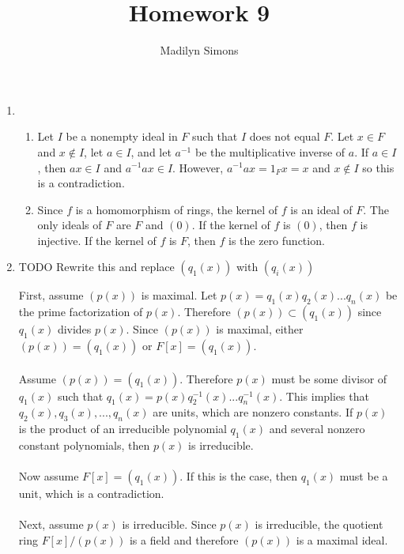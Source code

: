 \documentclass{article}
\title{Homework 9}
\author{Madilyn Simons}
\date{}
\begin{document}
\maketitle

\begin{enumerate}

\item
\begin{enumerate}

\item Let $I$ be a nonempty ideal in $F$ such that $I$ does not equal $F$.
Let $x \in F$ and $x \notin I$, let $a \in I$, and let $a^{-1}$ be the
multiplicative inverse of $a$.  If $a \in I$, then $ax \in I$ and
$a^{-1}ax \in I$.  However, $a^{-1}ax = 1_{F}x = x$ and $x \notin I$ so this
is a contradiction.

\item Since $f$ is a homomorphism of rings, the kernel of $f$ is an ideal
of $F$.  The only ideals of $F$ are $F$ and $(0)$.  If the kernel of
$f$ is $(0)$, then $f$ is injective.  If the kernel of $f$ is $F$, then
$f$ is the zero function.

\end{enumerate}

\item TODO Rewrite this and replace $(q_{1}(x))$ with $(q_{i}(x))$

First, assume $(p(x))$ is maximal.  Let
$p(x) = q_{1}(x)q_{2}(x) ... q_{n}(x)$ be the prime factorization of $p(x)$.
Therefore $(p(x)) \subset (q_{1}(x))$ since $q_{1}(x)$ divides $p(x)$.
Since $(p(x))$ is maximal, either $(p(x)) = (q_{1}(x))$ or $F[x] = (q_{1}(x))$.
\\ \\
Assume $(p(x)) = (q_{1}(x))$.  Therefore $p(x)$ must be some divisor of
$q_{1}(x)$ such that $q_{1}(x) = p(x)q_{2}^{-1}(x) ... q_{n}^{-1}(x)$.  This
implies that $q_{2}(x), q_{3}(x), ..., q_{n}(x)$ are units, which are nonzero
constants.  If $p(x)$ is the product of an irreducible polynomial $q_{1}(x)$
and several nonzero constant polynomials, then $p(x)$ is irreducible.
\\ \\
Now assume $F[x] = (q_{1}(x))$.  If this is the case, then $q_{1}(x)$ must
be a unit, which is a contradiction.
\\ \\
Next, assume $p(x)$ is irreducible.  Since $p(x)$ is irreducible, the quotient
ring $F[x]/(p(x))$ is a field and therefore $(p(x))$ is a maximal ideal.


\end{enumerate}
\end{document}
